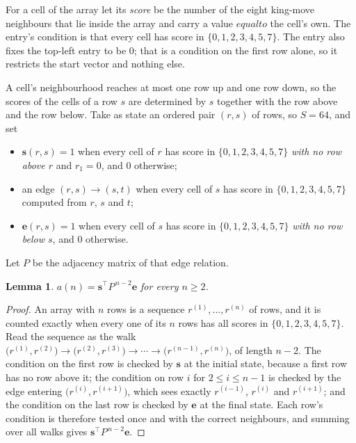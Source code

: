 \documentclass[11pt,a4paper]{article}
\theoremstyle{plain}
\newtheorem{lemma}[theorem]{Lemma}
\theoremstyle{definition}
\begin{document}
For a cell of the array let its \emph{score} be the number of the eight king-move neighbours that lie inside
the array and carry a value $equal to$ the cell's own. The entry's condition is that every cell
has score in $\{0,1,2,3,4,5,7\}$. The entry also fixes the top-left entry to be $0$; that is a condition on the first row alone, so it restricts the start vector and nothing else.

A cell's neighbourhood reaches at most one row up and one row down, so the scores of the
cells of a row $s$ are determined by $s$ together with the row above and the row below.
Take as state an ordered pair $(r,s)$ of rows, so $S=64$, and set
\begin{itemize}
\item $\mathbf{s}(r,s)=1$ when every cell of $r$ has score in $\{0,1,2,3,4,5,7\}$ \emph{with no row
above $r$} and $r_1=0$, and $0$ otherwise;
\item an edge $(r,s)\to(s,t)$ when every cell of $s$ has score in $\{0,1,2,3,4,5,7\}$ computed from
$r$, $s$ and $t$;
\item $\mathbf{e}(r,s)=1$ when every cell of $s$ has score in $\{0,1,2,3,4,5,7\}$ \emph{with no row
below $s$}, and $0$ otherwise.
\end{itemize}
Let $P$ be the adjacency matrix of that edge relation.

\begin{lemma}\label{lem:walk}
$a(n)=\mathbf{s}^{\!\top}P^{\,n-2}\mathbf{e}$ for every $n\ge2$.
\end{lemma}

\begin{proof}
An array with $n$ rows is a sequence $r^{(1)},\dots,r^{(n)}$ of rows, and it is counted
exactly when every one of its $n$ rows has all scores in $\{0,1,2,3,4,5,7\}$. Read the sequence as the
walk $\bigl(r^{(1)},r^{(2)}\bigr)\to\bigl(r^{(2)},r^{(3)}\bigr)\to\cdots\to
\bigl(r^{(n-1)},r^{(n)}\bigr)$, of length $n-2$. The condition on the first row is
checked by $\mathbf{s}$ at the initial state, because a first row has no row above it; the
condition on row $i$ for $2\le i\le n-1$ is checked by the edge entering
$\bigl(r^{(i)},r^{(i+1)}\bigr)$, which sees exactly $r^{(i-1)}$, $r^{(i)}$ and
$r^{(i+1)}$; and the condition on the last row is checked by $\mathbf{e}$ at the final
state. Each row's condition is therefore tested once and with the correct neighbours, and
summing over all walks gives $\mathbf{s}^{\!\top}P^{\,n-2}\mathbf{e}$.
\end{proof}
\end{document}
